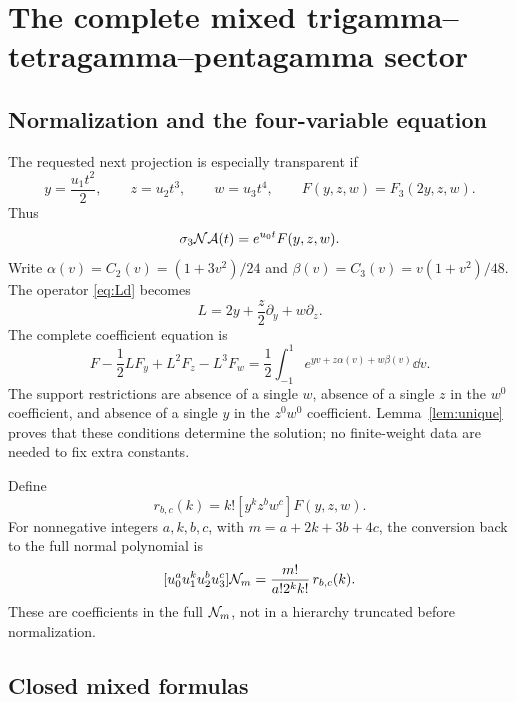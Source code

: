 \section{The complete mixed trigamma--tetragamma--pentagamma sector}
\label{sec:mixed}

\subsection{Normalization and the four-variable equation}

The requested next projection is especially transparent if
\begin{equation}\label{eq:xyz}
 y=\frac{u_1t^2}{2},\qquad z=u_2t^3,\qquad w=u_3t^4,
 \qquad F(y,z,w)=F_3(2y,z,w).
\end{equation}
Thus
\[
 \sigma_3\mathcal N\mathcal A(t)=e^{u_0t}F(y,z,w).
\]
Write $\alpha(v)=C_2(v)=(1+3v^2)/24$ and
$\beta(v)=C_3(v)=v(1+v^2)/48$. The operator \eqref{eq:Ld} becomes
\[
 L=2y+\frac z2\partial_y+w\partial_z.
\]
The complete coefficient equation is
\begin{equation}\label{eq:fourPDE}
 \boxed{\displaystyle
 F-\frac12LF_y+L^2F_z-L^3F_w
 =\frac12\int_{-1}^1e^{yv+z\alpha(v)+w\beta(v)}\dd v.}
\end{equation}
The support restrictions are absence of a single $w$, absence of a single $z$ in the $w^0$ coefficient, and absence of a single $y$ in the $z^0w^0$ coefficient. Lemma~\ref{lem:unique} proves that these conditions determine the solution; no finite-weight data are needed to fix extra constants.

Define
\begin{equation}\label{eq:rdef}
 r_{b,c}(k)=k![y^kz^bw^c]F(y,z,w).
\end{equation}
For nonnegative integers $a,k,b,c$, with $m=a+2k+3b+4c$, the conversion back to the full normal polynomial is
\begin{equation}\label{eq:r-to-coeff}
 [u_0^au_1^ku_2^bu_3^c]\mathcal N_m
 =\frac{m!}{a!2^kk!}\,r_{b,c}(k).
\end{equation}
These are coefficients in the full $\mathcal N_m$, not in a hierarchy truncated before normalization.

\subsection{Closed mixed formulas}

